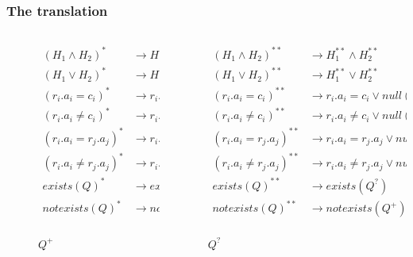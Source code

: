 \documentclass{beamer}
\begin{document}
		\begin{frame}
			\frametitle{The translation}
			\begin{columns}
				\begin{column}{0.38\textwidth}
					\begin{figure}[h]
						\begin{mdframed}[innerleftmargin=0pt, innerrightmargin=0pt, skipabove=0pt, skipbelow=0pt, innertopmargin=0pt, innerbottommargin=0pt, nobreak=true]
							\fontsize{7}{0}
							\begin{align*}
							(H_1 \land H_2)^* & \rightarrow H_1^* \land H_2^* \\
							(H_1 \lor H_2)^* & \rightarrow H_1^* \lor H_2^* \\
							(r_i.a_i = c_i)^* & \rightarrow r_i.a_i = c_i \\
							(r_i.a_i \neq c_i)^*& \rightarrow r_i.a_i \neq c_i \\
							(r_i.a_i = r_j.a_j)^* & \rightarrow r_i.a_i = r_j.a_j \\
							(r_i.a_i \neq r_j.a_j)^* & \rightarrow r_i.a_i \neq r_j.a_j \\
							exists(Q)^* & \rightarrow exists(Q^+) \\
							notexists(Q)^* & \rightarrow notexists(Q^?) \\
							\end{align*}
						\end{mdframed}
						\caption{$Q^+$}
					\end{figure}
				\end{column}
				\begin{column}{0.6\textwidth}
					\begin{figure}[b]
						\begin{mdframed}[innerleftmargin=0pt, innerrightmargin=0pt, skipabove=0pt, skipbelow=0pt, innertopmargin=0pt, innerbottommargin=0pt, nobreak=true]
							\fontsize{7}{0}
							\begin{align*}
							(H_1 \land H_2)^{**} & \rightarrow H_1^{**} \land H_2^{**} \\
							(H_1 \lor H_2)^{**} & \rightarrow H_1^{**} \lor H_2^{**} \\
							(r_i.a_i = c_i)^{**} & \rightarrow r_i.a_i = c_i \lor null(r_i.a_i)\\
							(r_i.a_i \neq c_i)^{**}& \rightarrow r_i.a_i \neq c_i \lor null(r_i.a_i)\\
							(r_i.a_i = r_j.a_j)^{**} & \rightarrow r_i.a_i = r_j.a_j \lor null(r_i.a_i) \lor null(r_j.a_j)\\
							(r_i.a_i \neq r_j.a_j)^{**} & \rightarrow r_i.a_i \neq r_j.a_j  \lor null(r_i.a_i) \lor null(r_j.a_j)\\
							exists(Q)^{**} & \rightarrow exists(Q^?) \\
							notexists(Q)^{**} & \rightarrow notexists(Q^+) \\
							\end{align*}
						\end{mdframed}
							\caption{$Q^?$}
					\end{figure}
				\end{column}
			\end{columns}
		\end{frame}
		
\end{document}
